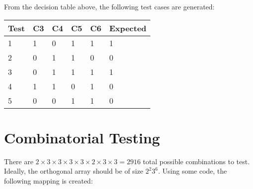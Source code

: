 \documentclass[letterpaper]{article}
\begin{document}
From the decision table above, the following test cases are generated:
\vspace{20pt}

\begin{adjustbox}{max width=\textwidth, center}
	\begin{tabular}{llllll}
		Test & C3 & C4 & C5 & C6 & Expected \\ \hline
		1    & 1  & 0  & 1  & 1  & 1        \\
		2    & 0  & 1  & 1  & 0  & 0        \\
		3    & 0  & 1  & 1  & 1  & 1        \\
		4    & 1  & 1  & 0  & 1  & 0        \\
		5    & 0  & 0  & 1  & 1  & 0        \\
	\end{tabular}
\end{adjustbox}
\section{Combinatorial Testing}
There are
$2 \times 3 \times 3 \times 3 \times 3 \times 2 \times 3 \times 3 = 2916$
total possible combinations to test.
Ideally, the orthogonal array should be of size $2^2 3^6$.
Using some code, the following mapping is created:
\vspace{20pt}
\end{document}
